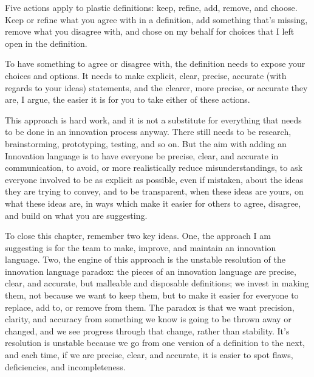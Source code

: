 Five actions apply to plastic definitions: keep, refine, add, remove, and choose. Keep or refine what you agree with in a definition, add something that's missing, remove what you disagree with, and chose on my behalf for choices that I left open in the definition. 

To have something to agree or disagree with, the definition needs to expose your choices and options. It needs to make explicit, clear, precise, accurate (with regards to your ideas) statements, and the clearer, more precise, or accurate they are, I argue, the easier it is for you to take either of these actions.

This approach is hard work, and it is not a substitute for everything  that needs to be done in an innovation process anyway. There still needs to be research, brainstorming, prototyping, testing, and so on. But the aim with adding an Innovation  language is to have everyone be precise, clear, and accurate in communication, to avoid, or more realistically reduce misunderstandings, to ask everyone involved to be as explicit as possible, even if mistaken, about the ideas they are trying to convey, and to be transparent, when these ideas are yours, on what these ideas are, in ways which make it easier for others to agree, disagree, and build on what you are suggesting.

To close this chapter, remember two key ideas. One, the approach I am suggesting is for the team to make, improve, and maintain an innovation language. Two, the engine of this approach is the unstable resolution of the innovation language paradox: the pieces of an innovation language are precise, clear, and accurate, but malleable and disposable definitions; we invest in making them, not because we want to keep them, but to make it easier for everyone to replace, add to, or remove from them. The paradox is that we want precision, clarity, and accuracy from something we know is going to be thrown away or changed, and we see progress through that change, rather than stability. It's resolution is unstable because we go from one version of a definition to the next, and each time, if we are precise, clear, and accurate, it is easier to spot flaws, deficiencies, and incompleteness. 


\printbibliography